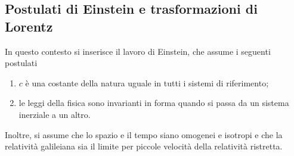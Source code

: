 \documentclass[a4paper,11pt]{book}
\theoremstyle{theorem}
\theoremstyle{definition}
\begin{document}
\subsection{Postulati di Einstein e trasformazioni di Lorentz}
In questo contesto si inserisce il lavoro di Einstein, che assume i seguenti postulati
\begin{enumerate}[label=(\roman*)]
	\item $c$ è una costante della natura uguale in tutti i sistemi di riferimento;
	\item le leggi della fisica sono invarianti in forma quando si passa da un sistema inerziale a un altro.
\end{enumerate}
Inoltre, si assume che lo spazio e il tempo siano omogenei e isotropi e che la relatività galileiana sia il limite per piccole velocità della relatività ristretta. 
\end{document}
